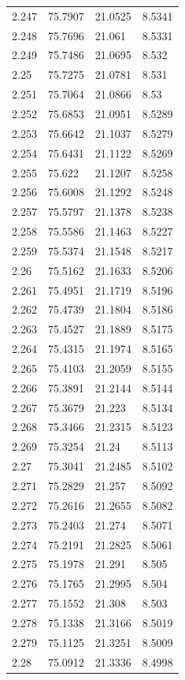 \begin{tabular}{llll}
2.247 & 75.7907 & 21.0525 & 8.5341 \\
2.248 & 75.7696 & 21.061 & 8.5331 \\
2.249 & 75.7486 & 21.0695 & 8.532 \\
2.25 & 75.7275 & 21.0781 & 8.531 \\
2.251 & 75.7064 & 21.0866 & 8.53 \\
2.252 & 75.6853 & 21.0951 & 8.5289 \\
2.253 & 75.6642 & 21.1037 & 8.5279 \\
2.254 & 75.6431 & 21.1122 & 8.5269 \\
2.255 & 75.622 & 21.1207 & 8.5258 \\
2.256 & 75.6008 & 21.1292 & 8.5248 \\
2.257 & 75.5797 & 21.1378 & 8.5238 \\
2.258 & 75.5586 & 21.1463 & 8.5227 \\
2.259 & 75.5374 & 21.1548 & 8.5217 \\
2.26 & 75.5162 & 21.1633 & 8.5206 \\
2.261 & 75.4951 & 21.1719 & 8.5196 \\
2.262 & 75.4739 & 21.1804 & 8.5186 \\
2.263 & 75.4527 & 21.1889 & 8.5175 \\
2.264 & 75.4315 & 21.1974 & 8.5165 \\
2.265 & 75.4103 & 21.2059 & 8.5155 \\
2.266 & 75.3891 & 21.2144 & 8.5144 \\
2.267 & 75.3679 & 21.223 & 8.5134 \\
2.268 & 75.3466 & 21.2315 & 8.5123 \\
2.269 & 75.3254 & 21.24 & 8.5113 \\
2.27 & 75.3041 & 21.2485 & 8.5102 \\
2.271 & 75.2829 & 21.257 & 8.5092 \\
2.272 & 75.2616 & 21.2655 & 8.5082 \\
2.273 & 75.2403 & 21.274 & 8.5071 \\
2.274 & 75.2191 & 21.2825 & 8.5061 \\
2.275 & 75.1978 & 21.291 & 8.505 \\
2.276 & 75.1765 & 21.2995 & 8.504 \\
2.277 & 75.1552 & 21.308 & 8.503 \\
2.278 & 75.1338 & 21.3166 & 8.5019 \\
2.279 & 75.1125 & 21.3251 & 8.5009 \\
2.28 & 75.0912 & 21.3336 & 8.4998 \\

\end{tabular}
